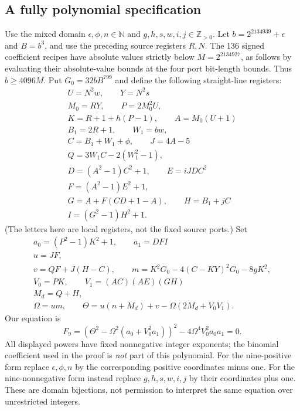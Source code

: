 \documentclass[11pt]{article}
\newcommand{\N}{\mathbb N}
\newcommand{\Pos}{\mathbb Z_{>0}}
\begin{document}
\subsection{A fully polynomial specification}
Use the mixed domain $\epsilon,\phi,n\in\N$ and $g,h,s,w,i,j\in\Pos$.
Let $b=2^{2134939}+\epsilon$ and $B=b^3$, and use the preceding source
registers $R,N$. The 136 signed coefficient recipes have absolute values
strictly below $M=2^{2134927}$, as follows by evaluating their absolute-value
bounds at the four port bit-length bounds. Thus $b\ge4096M$.
Put $G_0=32bB^{799}$ and define the following straight-line registers:
\[\begin{gathered}
U=N^2w,\qquad Y=N^2s\\
M_0=RY,\qquad P=2M_0^2U,\\
K=R+1+h(P-1),\qquad A=M_0(U+1)\\
B_1=2R+1,\qquad W_1=bw,\\
C=B_1+W_1+\phi,\qquad J=4A-5\\
Q=3W_1C-2(W_1^2-1),\\
D=(A^2-1)C^2+1,\qquad E=iJDC^2\\
F=(A^2-1)E^2+1,\\
G=A+F(CD+1-A),\qquad H=B_1+jC\\
I=(G^2-1)H^2+1.
\end{gathered}\]
(The letters here are local registers, not the fixed source ports.) Set
\[\begin{gathered}
a_0=(P^2-1)K^2+1,\qquad a_1=DFI\\
u=JF,\\
v=QF+J(H-C),\qquad m=K^2G_0-4(C-KY)^2G_0-8gK^2,\\
V_0=PK,\qquad V_1=(AC)(AE)(GH)\\
M_d=Q+H,\\
\Omega=um,\qquad \Theta=u(n+M_d)+v-\Omega(2M_d+V_0V_1).
\end{gathered}\]
Our equation is
\begin{equation}\label{eq:nine}
 \boxed{\ F_9=(\Theta^2-\Omega^2(a_0+V_0^2a_1))^2
                 -4\Omega^4V_0^2a_0a_1=0.\ }
\end{equation}
All displayed powers have fixed nonnegative integer exponents; the binomial
coefficient used in the proof is \emph{not} part of this polynomial.
For the nine-positive form replace $\epsilon,\phi,n$ by the corresponding
positive coordinates minus one. For the nine-nonnegative form instead replace
$g,h,s,w,i,j$ by their coordinates plus one. These are domain bijections,
not permission to interpret the same equation over unrestricted integers.
\end{document}
